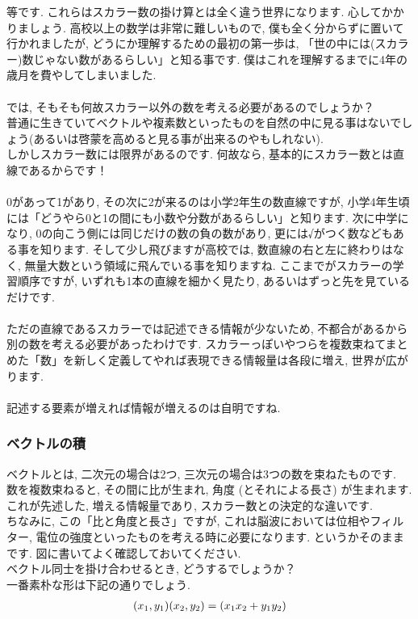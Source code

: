 \documentclass[11pt,a4paper]{jreport}
\begin{document}
等です. これらはスカラー数の掛け算とは全く違う世界になります. 心してかかりましょう. 高校以上の数学は非常に難しいもので, 僕も全く分からずに置いて行かれましたが, どうにか理解するための最初の第一歩は, 「世の中には(スカラー)数じゃない数があるらしい」と知る事です. 僕はこれを理解するまでに4年の歳月を費やしてしまいました. \\
\\
では, そもそも何故スカラー以外の数を考える必要があるのでしょうか？\\
普通に生きていてベクトルや複素数といったものを自然の中に見る事はないでしょう(あるいは啓蒙を高めると見る事が出来るのやもしれない).\\
しかしスカラー数には限界があるのです. 何故なら, 基本的にスカラー数とは直線であるからです！ \\
\\
0があって1があり, その次に2が来るのは小学2年生の数直線ですが, 小学4年生頃には「どうやら0と1の間にも小数や分数があるらしい」と知ります. 次に中学になり, 0の向こう側には同じだけの数の負の数があり, 更には√がつく数などもある事を知ります. そして少し飛びますが高校では, 数直線の右と左に終わりはなく, 無量大数という領域に飛んでいる事を知りますね. ここまでがスカラーの学習順序ですが, いずれも1本の直線を細かく見たり, あるいはずっと先を見ているだけです. \\
\\
ただの直線であるスカラーでは記述できる情報が少ないため, 不都合があるから別の数を考える必要があったわけです. スカラーっぽいやつらを複数束ねてまとめた「数」を新しく定義してやれば表現できる情報量は各段に増え, 世界が広がります. \\
\\
記述する要素が増えれば情報が増えるのは自明ですね. 
\\
\subsubsection{ベクトルの積}
ベクトルとは, 二次元の場合は2つ, 三次元の場合は3つの数を束ねたものです. \\
数を複数束ねると, その間に比が生まれ, 角度 (とそれによる長さ) が生まれます. \\
これが先述した, 増える情報量であり, スカラー数との決定的な違いです.\\
ちなみに, この「比と角度と長さ」ですが, これは脳波においては位相やフィルター, 電位の強度といったものを考える時に必要になります. というかそのままです. 図に書いてよく確認しておいてください. 
\\
ベクトル同士を掛け合わせるとき, どうするでしょうか？\\
一番素朴な形は下記の通りでしょう.\\
\begin{eqnarray}
(\mathstrut x_1 , \mathstrut y_1)(\mathstrut x_2 , \mathstrut y_2 ) = (\mathstrut x_1 \mathstrut x_2 + \mathstrut y_1 \mathstrut y_2)
\end{eqnarray}
\end{document}
